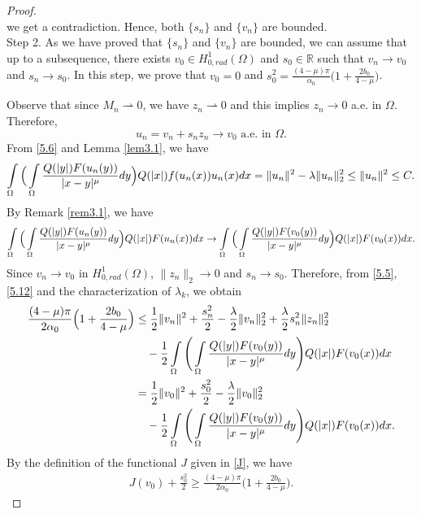 \documentclass[11pt]{amsart}
\numberwithin{equation}{section}
\newcommand{\R}{\mathbb{R}}
\newcommand{\hr}{H^1_{0, rad}(\Omega)}
\newcommand{\1}{\frac{1}{2}}
\begin{document}
\begin{proof}
\begin{equation*}
		\end{equation*}
		we get a contradiction. Hence, both $\{s_n\}$ and $\{v_n\}$ are bounded. \\
		Step 2. As we have proved that $\{s_n\}$ and $\{v_n\}$ are bounded, we can assume that up to a subsequence, there exists $v_0 \in \hr$ and $s_0\in \R$ such that $v_n \rightarrow v_0$ and $s_n \rightarrow s_0$. In this step, we prove that $v_0=0$ and $s_0^2 = \frac{(4-\mu)\pi}{\alpha_0}\Big( 1+\frac{2b_0}{4-\mu}\Big)$.
		
		Observe that since $M_n \rightharpoonup 0$, we have $ z_n \rightharpoonup 0$ and this implies $z_n \to 0$ a.e. in $\Omega$. Therefore, 
		\[u_n=v_n+s_n z_n \to v_0 \text{ a.e. in } \Omega.\]
		From \eqref{5.6} and Lemma \ref{lem3.1}, we have
		\begin{align*} \int\limits\limits_\Omega \Big( \int\limits\limits_\Omega \frac{Q(|y|)F(u_n(y))}{|x-y|^\mu}dy \Big) Q(|x|)f(u_n(x))u_n(x)dx = \|u_n\|^2 - \lambda\|u_n\|^2_2\leq  \|u_n\|^2 \leq C.
		\end{align*}
		By Remark \ref{rem3.1}, we have 
		\begin{equation} 
			\label{5.12}
			\int\limits\limits_\Omega \Big( \int\limits\limits_\Omega \frac{Q(|y|)F(u_n(y))}{|x-y|^\mu}dy \Big) Q(|x|)F(u_n(x)) dx \rightarrow \int\limits\limits_\Omega \Big( \int\limits\limits_\Omega \frac{Q(|y|)F(v_0(y))}{|x-y|^\mu}dy \Big) Q(|x|)F(v_0(x))dx.
		\end{equation}
		Since $v_n \rightarrow v_0$ in $\hr$, $\|z_n\|_2 \rightarrow 0$ and $s_n\to s_0$. Therefore, from \eqref{5.5}, \eqref{5.12} and the characterization of $\lambda_k$, we obtain
		\begin{align*}
			\frac{(4-\mu)\pi}{2\alpha_0} \Big( 1+\frac{2b_0}{4-\mu}\Big)&\leq \frac{1}{2} \|v_n\|^2 + \frac{s_n^2}{2} - \frac{\lambda}{2} \|v_n\|^2_2+ \frac{\lambda}{2} s_n^2 \|z_n\|_2^2\\
			&\quad- \frac{1}{2} \int\limits\limits_\Omega \Bigg( \int\limits\limits_\Omega \frac{Q(|y|)F(v_0(y))}{|x-y|^\mu}dy \Bigg) Q(|x|)F(v_0(x))dx\\
			& = \frac{1}{2} \|v_0\|^2 + \frac{s_0^2}{2} - \frac{\lambda}{2} \|v_0\|^2_2 \\
			&\quad- \frac{1}{2} \int\limits\limits_\Omega \Bigg( \int\limits\limits_\Omega \frac{Q(|y|)F(v_0(y))}{|x-y|^\mu}dy \Bigg) Q(|x|)F(v_0(x))dx.
		\end{align*}
		By the definition of the functional $J$ given in \eqref{J}, we have
		\begin{align}
			\label{6.1}
			J(v_0) + \frac{s_0^2}{2} \geq 	\frac{(4-\mu)\pi}{2\alpha_0} \Big( 1+\frac{2b_0}{4-\mu}\Big).

\end{align}
\end{proof}
\end{document}
